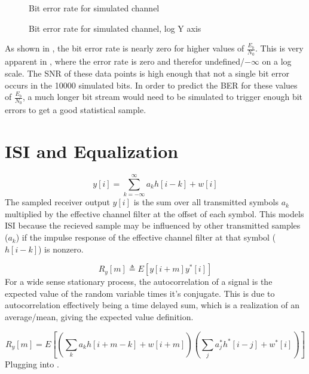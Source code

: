 \documentclass[11pt]{article}
\begin{document}
\begin{figure}[H]
    \centering
    \scalebox{0.7}{}
    \caption{Bit error rate for simulated channel\label{error}}
\end{figure}

\begin{figure}[H]
    \centering
    \scalebox{0.7}{}
    \caption{Bit error rate for simulated channel, log Y axis\label{errorlog}}
\end{figure}

As shown in , the bit error rate is nearly zero for higher values of
$\frac{E_b}{N_0}$. This is very apparent in , where the error
rate is zero and therefor undefined/$-\infty$ on a log scale. The SNR of these
data points is high enough that not a single bit error occurs in the 10000
simulated bits. In order to predict the BER for these values of
$\frac{E_b}{N_0}$, a much longer bit stream would need to be simulated to
trigger enough bit errors to get a good statistical sample.

\section{ISI and Equalization}
\begin{equation}\label{ysum}
    y[i] = \sum_{k=-\infty}^{\infty}  a_k h[i-k]+w[i]
\end{equation}
The sampled receiver output $y[i]$ is the sum over all transmitted symbols $a_k$
multiplied by the effective channel filter at the offset of each symbol. This
models ISI because the recieved sample may be influenced by other transmitted
samples ($a_k$) if the impulse response of the effective channel filter at that
symbol ($h[i-k]$) is nonzero.

\begin{equation}\label{autocorr_exp}
    R_y[m] \triangleq E\left[ y[i+m] y^*[i]\right]
\end{equation}
For a wide sense stationary process, the autocorrelation of a signal is the
expected value of the random variable times it's conjugate. This is due to
autocorrelation effectively being a time delayed sum, which is a realization of
an average/mean, giving the expected value definition.

\begin{equation}\label{bigsum}
    R_y[m] = E \left[ \left( \sum_k a_k h[i+m-k]+w[i+m] \right) \left( \sum_j
        a_j^* h^*[i-j]+w^*[i] \right) \right]
\end{equation}
Plugging  into .
\end{document}
